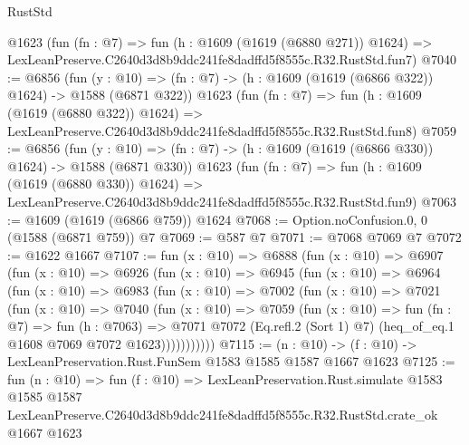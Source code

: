 \begin{lexlean}{RustStd}
\begin{coremodule}
    @1623
    (fun (fn : @7) =>
    fun (h : @1609 (@1619 (@6880 @271)) @1624) =>
    LexLeanPreserve.C2640d3d8b9ddc241fe8dadffd5f8555c.R32.RustStd.fun7)
@7040 := @6856
    (fun (y : @10) => (fn : @7) -> (h : @1609 (@1619 (@6866 @322)) @1624) -> @1588 (@6871 @322))
    @1623
    (fun (fn : @7) =>
    fun (h : @1609 (@1619 (@6880 @322)) @1624) =>
    LexLeanPreserve.C2640d3d8b9ddc241fe8dadffd5f8555c.R32.RustStd.fun8)
@7059 := @6856
    (fun (y : @10) => (fn : @7) -> (h : @1609 (@1619 (@6866 @330)) @1624) -> @1588 (@6871 @330))
    @1623
    (fun (fn : @7) =>
    fun (h : @1609 (@1619 (@6880 @330)) @1624) =>
    LexLeanPreserve.C2640d3d8b9ddc241fe8dadffd5f8555c.R32.RustStd.fun9)
@7063 := @1609 (@1619 (@6866 @759)) @1624
@7068 := Option.noConfusion.{0, 0} (@1588 (@6871 @759)) @7
@7069 := @587 @7
@7071 := @7068 @7069 @7
@7072 := @1622 @1667
@7107 := fun (x : @10) =>
  @6888
    (fun (x : @10) =>
    @6907
      (fun (x : @10) =>
      @6926
        (fun (x : @10) =>
        @6945
          (fun (x : @10) =>
          @6964
            (fun (x : @10) =>
            @6983
              (fun (x : @10) =>
              @7002
                (fun (x : @10) =>
                @7021
                  (fun (x : @10) =>
                  @7040
                    (fun (x : @10) =>
                    @7059
                      (fun (x : @10) =>
                      fun (fn : @7) =>
                      fun (h : @7063) =>
                      @7071
                        @7072
                        (Eq.refl.{2} (Sort 1) @7)
                        (heq_of_eq.{1} @1608 @7069 @7072 @1623)))))))))))
@7115 := (n : @10) -> (f : @10) -> LexLeanPreservation.Rust.FunSem @1583 @1585 @1587 @1667 @1623
@7125 := fun (n : @10) =>
  fun (f : @10) =>
  LexLeanPreservation.Rust.simulate
    @1583
    @1585
    @1587
    LexLeanPreserve.C2640d3d8b9ddc241fe8dadffd5f8555c.R32.RustStd.crate_ok
    @1667
    @1623
\end{coremodule}
\end{lexlean}
